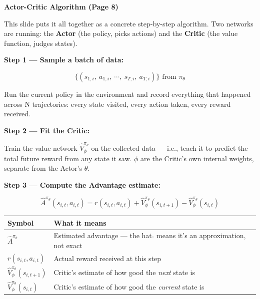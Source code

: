 \bigskip


\textbf{Actor-Critic Algorithm (Page 8)}

\medskip

This slide puts it all together as a concrete step-by-step algorithm. Two networks are running: the \textbf{Actor} (the policy, picks actions) and the \textbf{Critic} (the value function, judges states).

\medskip

\textbf{Step 1 --- Sample a batch of data:}

\[
\{(s_{1,i},\ a_{1,i},\ \cdots,\ s_{T,i},\ a_{T,i})\} \text{ from } \pi_\theta
\]

Run the current policy in the environment and record everything that happened across N trajectories: every state visited, every action taken, every reward received.

\medskip

\textbf{Step 2 --- Fit the Critic:}

Train the value network $\hat{V}_\phi^{\pi_\theta}$ on the collected data --- i.e., teach it to predict the total future reward from any state it saw. $\phi$ are the Critic's own internal weights, separate from the Actor's $\theta$.

\medskip

\textbf{Step 3 --- Compute the Advantage estimate:}

\[
\hat{A}^{\pi_\theta}(s_{i,t}, a_{i,t}) = r(s_{i,t}, a_{i,t}) + \hat{V}_\phi^{\pi_\theta}(s_{i,t+1}) - \hat{V}_\phi^{\pi_\theta}(s_{i,t})
\]

\begin{center}
\begin{tabular}{ll}
\hline
Symbol & What it means \\
\hline
$\hat{A}^{\pi_\theta}$ & Estimated advantage --- the hat $\hat{}$ means it's an approximation, not exact \\
$r(s_{i,t}, a_{i,t})$ & Actual reward received at this step \\
$\hat{V}_\phi^{\pi_\theta}(s_{i,t+1})$ & Critic's estimate of how good the \textit{next} state is \\
$\hat{V}_\phi^{\pi_\theta}(s_{i,t})$ & Critic's estimate of how good the \textit{current} state is \\
\hline
\end{tabular}
\end{center}

